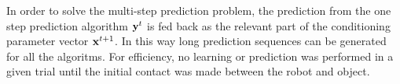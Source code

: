 
In order to solve the multi-step prediction problem, the prediction from the one step prediction algorithm $\mathbf{y}^t$ is fed back as the relevant part of the conditioning parameter vector $\mathbf{x}^{t+1}$. In this way long prediction sequences can be generated for all the algoritms. For efficiency, no learning or prediction was performed in a given trial until the initial contact was made between the robot and object.
